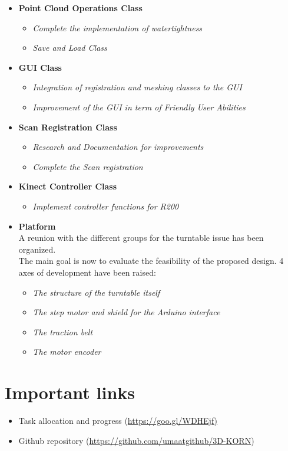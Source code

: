 \documentclass[11pt]{article} %
\begin{document}
\begin{itemize}

\item \textbf{Point Cloud Operations Class}
\begin{itemize}
\item \textit{Complete the implementation of watertightness}
\item \textit{Save and Load Class}
\end{itemize}

\item \textbf{GUI Class}
\begin{itemize}
\item \textit{Integration of registration and meshing classes to the GUI}
\item \textit{Improvement of the GUI in term of Friendly User Abilities}
\end{itemize}

\item \textbf{Scan Registration Class}
\begin{itemize}
\item \textit{Research and Documentation for improvements}
\item \textit{Complete the Scan registration}
\end{itemize}

\item \textbf{Kinect Controller Class}
\begin{itemize}
\item \textit{Implement controller functions for R200}
\end{itemize}

\item \textbf{Platform}\\
A reunion with the different groups for the turntable issue has been organized.\\
The main goal is now to evaluate the feasibility of the proposed design. 4 axes of development have been raised:
\begin{itemize}
\item \textit{The structure of the turntable itself}
\item \textit{The step motor and shield for the Arduino interface}
\item \textit{The traction belt}
\item \textit{The motor encoder}
\end{itemize}


\end{itemize}

\section{Important links}
\begin{itemize}
\item Task allocation and progress  (\url{https://goo.gl/WDHEjf)}
\item Github repository (\url{https://github.com/umaatgithub/3D-KORN})
\end{itemize}
\end{document}
